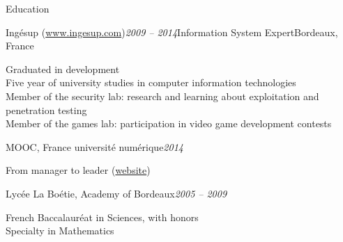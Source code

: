\begin{rSection}{Education}
  \begin{rSubsection}{Ingésup (\href{www.ingesup.com}{www.ingesup.com})}{\em 2009 -- 2014}{Information System Expert}{Bordeaux, France}
    \item[] Graduated in development \\
    Five year of university studies in computer information technologies \\
    Member of the security lab: research and learning about exploitation and penetration testing \\
    Member of the games lab: participation in video game development contests
  \end{rSubsection}

  \begin{rSubsection}{MOOC, France universit\'{e} num\'{e}rique}{\em 2014}{}{}
    \item[] From manager to leader (\href{https://www.france-universite-numerique-mooc.fr/courses/CNAM/01002/Trimestre_1_2014/about}{website})
  \end{rSubsection}

  \begin{rSubsection}{Lyc\'{e}e La Bo\'{e}tie, Academy of Bordeaux}{\em 2005 -- 2009}{}{}
    \item[] French Baccalaur\'{e}at in Sciences, with honors \\
    Specialty in Mathematics
  \end{rSubsection}

\end{rSection}
